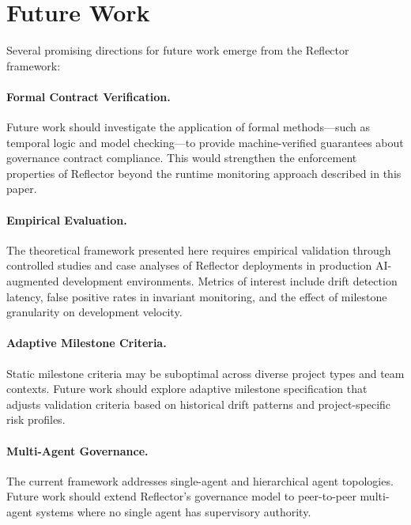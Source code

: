 \section{Future Work}
\label{sec:future-work}

%

Several promising directions for future work emerge from the Reflector framework:

\paragraph{Formal Contract Verification.}
Future work should investigate the application of formal methods—such as temporal logic
and model checking—to provide machine-verified guarantees about governance contract
compliance. This would strengthen the enforcement properties of Reflector beyond the
runtime monitoring approach described in this paper.

\paragraph{Empirical Evaluation.}
The theoretical framework presented here requires empirical validation through controlled
studies and case analyses of Reflector deployments in production AI-augmented development
environments. Metrics of interest include drift detection latency, false positive rates
in invariant monitoring, and the effect of milestone granularity on development velocity.

\paragraph{Adaptive Milestone Criteria.}
Static milestone criteria may be suboptimal across diverse project types and team
contexts. Future work should explore adaptive milestone specification that adjusts
validation criteria based on historical drift patterns and project-specific risk profiles.

\paragraph{Multi-Agent Governance.}
The current framework addresses single-agent and hierarchical agent topologies.
Future work should extend Reflector's governance model to peer-to-peer multi-agent
systems where no single agent has supervisory authority.
